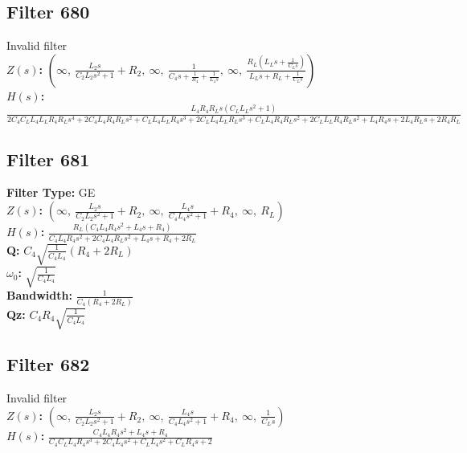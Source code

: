 \documentclass{article}
\begin{document}
\subsection*{Filter 680}
Invalid filter \\ 
\textbf{$Z(s)$:} $\left( \infty, \  \frac{L_{2} s}{C_{2} L_{2} s^{2} + 1} + R_{2}, \  \infty, \  \frac{1}{C_{4} s + \frac{1}{R_{4}} + \frac{1}{L_{4} s}}, \  \infty, \  \frac{R_{L} \left(L_{L} s + \frac{1}{C_{L} s}\right)}{L_{L} s + R_{L} + \frac{1}{C_{L} s}}\right)$ \\ 
\textbf{$H(s)$:} $\frac{L_{4} R_{4} R_{L} s \left(C_{L} L_{L} s^{2} + 1\right)}{2 C_{4} C_{L} L_{4} L_{L} R_{4} R_{L} s^{4} + 2 C_{4} L_{4} R_{4} R_{L} s^{2} + C_{L} L_{4} L_{L} R_{4} s^{3} + 2 C_{L} L_{4} L_{L} R_{L} s^{3} + C_{L} L_{4} R_{4} R_{L} s^{2} + 2 C_{L} L_{L} R_{4} R_{L} s^{2} + L_{4} R_{4} s + 2 L_{4} R_{L} s + 2 R_{4} R_{L}}$ \\ 
\subsection*{Filter 681}
\textbf{Filter Type:} GE \\ 
\textbf{$Z(s)$:} $\left( \infty, \  \frac{L_{2} s}{C_{2} L_{2} s^{2} + 1} + R_{2}, \  \infty, \  \frac{L_{4} s}{C_{4} L_{4} s^{2} + 1} + R_{4}, \  \infty, \  R_{L}\right)$ \\ 
\textbf{$H(s)$:} $\frac{R_{L} \left(C_{4} L_{4} R_{4} s^{2} + L_{4} s + R_{4}\right)}{C_{4} L_{4} R_{4} s^{2} + 2 C_{4} L_{4} R_{L} s^{2} + L_{4} s + R_{4} + 2 R_{L}}$ \\ 
\textbf{Q:} $C_{4} \sqrt{\frac{1}{C_{4} L_{4}}} \left(R_{4} + 2 R_{L}\right)$ \\ 
\textbf{$\omega_0$:} $\sqrt{\frac{1}{C_{4} L_{4}}}$ \\ 
\textbf{Bandwidth:} $\frac{1}{C_{4} \left(R_{4} + 2 R_{L}\right)}$ \\ 
\textbf{Qz:} $C_{4} R_{4} \sqrt{\frac{1}{C_{4} L_{4}}}$ \\ 
\subsection*{Filter 682}
Invalid filter \\ 
\textbf{$Z(s)$:} $\left( \infty, \  \frac{L_{2} s}{C_{2} L_{2} s^{2} + 1} + R_{2}, \  \infty, \  \frac{L_{4} s}{C_{4} L_{4} s^{2} + 1} + R_{4}, \  \infty, \  \frac{1}{C_{L} s}\right)$ \\ 
\textbf{$H(s)$:} $\frac{C_{4} L_{4} R_{4} s^{2} + L_{4} s + R_{4}}{C_{4} C_{L} L_{4} R_{4} s^{3} + 2 C_{4} L_{4} s^{2} + C_{L} L_{4} s^{2} + C_{L} R_{4} s + 2}$ \\ 
\end{document}
